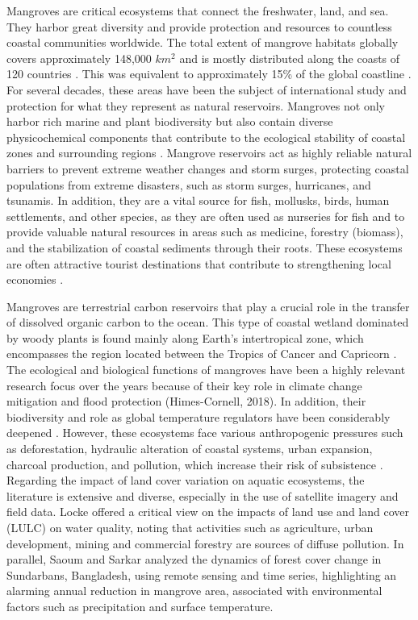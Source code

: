 \documentclass[10pt,a4paper,twocolumn]{article}
\begin{document}
Mangroves are critical ecosystems that connect the freshwater, land, and sea. They harbor great diversity and provide protection and resources to countless coastal communities worldwide. The total extent of mangrove habitats globally covers approximately 148,000 $km^{2}$ and is mostly distributed along the coasts of 120 countries \cite{sharma2018introductory}. This was equivalent to approximately 15\% of the global coastline \cite{bunting2022global}. For several decades, these areas have been the subject of international study and protection for what they represent as natural reservoirs. Mangroves not only harbor rich marine and plant biodiversity but also contain diverse physicochemical components that contribute to the ecological stability of coastal zones and surrounding regions \cite{hendarto2024ecosystem}. Mangrove reservoirs act as highly reliable natural barriers to prevent extreme weather changes and storm surges, protecting coastal populations from extreme disasters, such as storm surges, hurricanes, and tsunamis. In addition, they are a vital source for fish, mollusks, birds, human settlements, and other species, as they are often used as nurseries for fish and to provide valuable natural resources in areas such as medicine, forestry (biomass), and the stabilization of coastal sediments through their roots. These ecosystems are often attractive tourist destinations that contribute to strengthening local economies \cite{bindiya2023conservation, sunkur2023mangroves}. 

Mangroves are terrestrial carbon reservoirs that play a crucial role in the transfer of dissolved organic carbon to the ocean. This type of coastal wetland dominated by woody plants is found mainly along Earth's intertropical zone, which encompasses the region located between the Tropics of Cancer and Capricorn \cite{spalding2024state}. The ecological and biological functions of mangroves have been a highly relevant research focus over the years because of their key role in climate change mitigation and flood protection  (Himes-Cornell, 2018). In addition, their biodiversity and role as global temperature regulators have been considerably deepened \cite{alongi2022climate,tasneem2024bibliometric}. However, these ecosystems face various anthropogenic pressures such as deforestation, hydraulic alteration of coastal systems, urban expansion, charcoal production, and pollution, which increase their risk of subsistence \cite{ortiz2018diversidad}.
Regarding the impact of land cover variation on aquatic ecosystems, the literature is extensive and diverse, especially in the use of satellite imagery and field data. Locke \cite{locke2024impacts} offered a critical view on the impacts of land use and land cover (LULC) on water quality, noting that activities such as agriculture, urban development, mining and commercial forestry are sources of diffuse pollution. In parallel, Saoum and Sarkar \cite{saoum2024monitoring} analyzed the dynamics of forest cover change in Sundarbans, Bangladesh, using remote sensing and time series, highlighting an alarming annual reduction in mangrove area, associated with environmental factors such as precipitation and surface temperature. 
\end{document}

